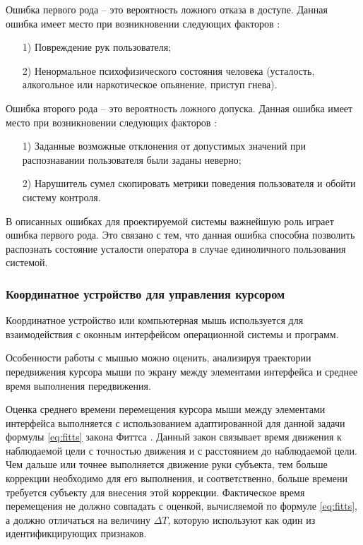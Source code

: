 Ошибка первого рода -- это вероятность ложного отказа в доступе. Данная ошибка имеет место при возникновении следующих факторов \cite{keystroke}: 
\begin{itemize}[leftmargin=1.6\parindent]
\item[1)] Повреждение рук пользователя;
\item[2)] Ненормальное психофизического состояния человека (усталость, алкогольное или наркотическое опьянение, приступ гнева).
\end{itemize}

Ошибка второго рода -- это вероятность ложного допуска. Данная ошибка имеет место при возникновении следующих факторов \cite{keystroke}:
\begin{itemize}[leftmargin=1.6\parindent]
\item[1)] Заданные возможные отклонения от допустимых значений при распознавании пользователя были заданы неверно;
\item[2)] Нарушитель сумел скопировать метрики поведения пользователя и обойти систему контроля.
\end{itemize}

В описанных ошибках для проектируемой системы важнейшую роль играет ошибка первого рода. Это связано с тем, что данная ошибка способна позволить распознать состояние усталости оператора в случае единоличного пользования системой.

\subsubsection{Координатное устройство для управления курсором}
Координатное устройство или компьютерная мышь используется для взаимодействия с оконным интерфейсом операционной системы и программ.

Особенности работы с мышью можно оценить, анализируя траектории передвижения курсора мыши по экрану между элементами интерфейса и среднее время выполнения передвижения. \cite{recognitionOfPsycho}

Оценка среднего времени перемещения курсора мыши между элементами интерфейса выполняется с использованием адаптированной для данной задачи формулы \ref{eq:fitts} закона Фиттса \cite{fitts}. Данный закон связывает время движения к наблюдаемой цели с точностью движения и с расстоянием до наблюдаемой цели. Чем дальше или точнее выполняется движение руки субъекта, тем больше коррекции необходимо для его выполнения, и соответственно, больше времени требуется субъекту для внесения этой коррекции. Фактическое время перемещения не должно совпадать с оценкой, вычисляемой по формуле \ref{eq:fitts}, а должно отличаться на величину $\Delta T$, которую используют как один из идентификцирующих признаков. \cite{mouseMethod}

